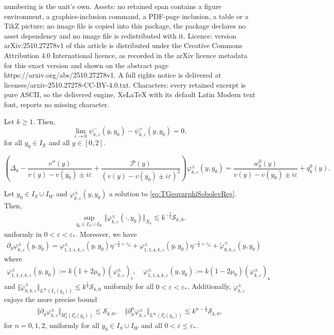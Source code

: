 \documentclass[10pt,a4paper]{amsart}
\newcommand\cS{{\mathcal S}}
\newcommand{\D}{{\Delta}}
\newcommand{\ep}{\varepsilon}
\newcommand{\sr}{{\mathsf{r}}}
\newcommand{\s}{{\mathsf{s}}}
\renewcommand{\P}{{\mathcal{P}}}
\renewcommand{\l}{\left}
\renewcommand{\r}{\right}
\begin{document}
numbering is the unit's own. Assets: no retained span contains a figure environment, a graphics-inclusion command, a PDF-page inclusion, a table or a TikZ picture; no image file is copied into this package, the package declares no asset dependency and no image file is redistributed with it. Licence: version arXiv:2510.27278v1 of this article is distributed under the Creative Commons Attribution 4.0 International licence, as recorded in the arXiv licence metadata for this exact version and shown on the abstract page https://arxiv.org/abs/2510.27278v1. A full rights notice is delivered at licenses/arxiv-2510.27278-CC-BY-4.0.txt. Characters: every retained excerpt is pure ASCII, so the delivered engine, XeLaTeX with its default Latin Modern text font, reports no missing character.
\begin{lemma}\label{lemma:vanishingpsiIE}
Let $k\geq 1$. Then,
\begin{equation*}
\lim_{\ep \rightarrow 0}\psi_{k,\ep}^-(y,y_0) - \psi_{k,\ep}^+(y,y_0) = 0,
\end{equation*}
for all $y_0\in I_E$ and all $y\in [0,2]$.
\end{lemma}

\begin{equation}\label{eq:TGeqvarphiSobolevReg}
\l(\D_k-\frac{v''(y)}{v(y)-v(y_0)\pm i\ep}+\frac{\P(y)}{(v(y)-v(y_0)\pm i\ep)^2}\r){\varphi}_{k,\ep}^\pm(y,y_0)=\frac{w_k^0(y)}{v(y)-v(y_0)\pm i\ep} + q_k^0(y).
\end{equation}

\begin{proposition}\label{prop:Xkvarphi}
Let $y_0\in I_S\cup I_W$ and ${\varphi}_{k,\ep}^\pm(y,y_0)$ a solution to \eqref{eq:TGeqvarphiSobolevReg}. Then,
\begin{align*}
\sup_{y_0\in I_S\cup I_W}\Vert {\varphi}_{k,\ep}^\pm(\cdot,y_0) \Vert_{X_k}\lesssim k^{-\frac12}\cS_{k,0}.
\end{align*}
uniformly in $0< \ep< \ep_*$. Moreover, we have
\begin{align}\label{eq:decomXkpyvarphi}
\partial_y\varphi_{k,\ep}^\pm(y,y_0) =  \varphi_{1,1,\sr,k,\ep}^\pm(y,y_0) \eta^{-\frac12+\gamma_0} + \varphi_{1,1,\s,k,\ep}^\pm(y,y_0) \eta^{-\frac12+\gamma_0} + \widetilde\varphi_{0,k,\ep}^\pm(y,y_0) 
\end{align}
where
\begin{align*}
\varphi_{1,1,\sr,k,\ep}^\pm (y,y_0) := k(1+2\mu_0)\left( \varphi_{k,\ep}^\pm \right)_\sr, \quad \varphi_{1,1,\s,k,\ep}^\pm (y,y_0) := k(1-2\mu_0)\left( \varphi_{k,\ep}^\pm \right)_\s
\end{align*}
and $\Vert \widetilde\varphi_{0,k,\ep}^\pm \Vert_{L^\infty(I_3(y_0))} \lesssim k^{\frac12}\cS_{k,0}$ uniformly for all $0< \ep< \ep_*$. Additionally, $\varphi_{k,\ep}^\pm$ enjoys the more precise bound
\begin{align*}
\Vert \partial_{y}\varphi_{k,\ep}^\pm \Vert_{H_k^1(I_3^c(y_0))} \lesssim  \cS_{k,0}, \quad \Vert \partial_y^n\varphi_{k,\ep}^\pm \Vert_{L^{\infty}(I_3^c(y_0))} \lesssim k^{n-\frac12}\cS_{k,0}, 
\end{align*}
for $n=0,1,2$, uniformly for all $y_0\in I_S\cup I_{W}$ and all $0 < \ep\leq \ep_*$.
\end{proposition}
\end{document}

